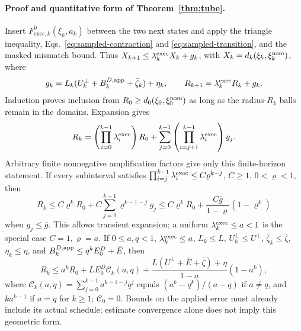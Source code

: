 \paragraph{Proof and quantitative form of Theorem~\ref{thm:tube}.}
Insert $F_{\mathrm{exec},k}^0(\xi_k,a_k)$ between the two next states and apply the triangle
inequality, Eqs.~\eqref{eq:sampled-contraction} and
\eqref{eq:sampled-transition}, and the masked mismatch bound. Thus
$X_{k+1}\le \lambda_k^{\rm exec}X_k+g_k$, with $X_k=d_k(\xi_k,\xi_{k}^{\rm nom})$, where
\begin{equation}
g_k=L_k(U_k^\perp+B_k^{D,\rm app}+\bar\zeta_k)+\eta_k,
\qquad R_{k+1}=\lambda_k^{\rm exec}R_k+g_k.
\label{eq:app-tube-recursion}
\end{equation}
Induction proves inclusion from $R_0\ge d_0(\xi_0,\xi_{0}^{\rm nom})$ as long as the
radius-$R_k$ balls remain in the domains. Expansion gives
\begin{equation}
R_k=\left(\prod_{i=0}^{k-1}\lambda_i^{\rm exec}\right)R_0+
\sum_{j=0}^{k-1}\left(\prod_{i=j+1}^{k-1}\lambda_i^{\rm exec}\right)g_j.
\label{eq:app-tube-product}
\end{equation}
Arbitrary finite nonnegative amplification factors give only this
finite-horizon statement. If every subinterval satisfies
$\prod_{i=j}^{k-1}\lambda_i^{\rm exec}\le C\varrho^{k-j}$, $C\ge1$, $0<\varrho<1$, then
\begin{equation}
R_k\le C\varrho^kR_0+C\sum_{j=0}^{k-1}\varrho^{k-1-j}g_j
\le C\varrho^kR_0+\frac{C\bar g}{1-\varrho}(1-\varrho^k)
\label{eq:app-product-recovery}
\end{equation}
when $g_j\le\bar g$. This allows transient expansion; a uniform
$\lambda_k^{\rm exec}\le a<1$ is the special case $C=1,\varrho=a$.
If $0\le a,q<1$, $\lambda_k^{\rm exec}\le a$, $L_k\le L$, $U_k^\perp\le U^\perp$,
$\bar\zeta_k\le\bar\zeta$, $\eta_k\le\eta$, and
$B_k^{D,\rm app}\le q^k E_0^D+\bar E$, then
\begin{equation}
R_k\le a^kR_0+LE_0^D\mathcal C_k(a,q)+
\frac{L(U^\perp+\bar E+\bar\zeta)+\eta}{1-a}(1-a^k),
\label{eq:app-tube-geometric}
\end{equation}
where $\mathcal C_k(a,q)=\sum_{j=0}^{k-1}a^{k-1-j}q^j$ equals
$(a^k-q^k)/(a-q)$ if $a\ne q$, and $ka^{k-1}$ if $a=q$ for $k\ge1$;
$\mathcal C_0=0$. Bounds on the applied error must already include its actual
schedule; estimate convergence alone does not imply this geometric form.

